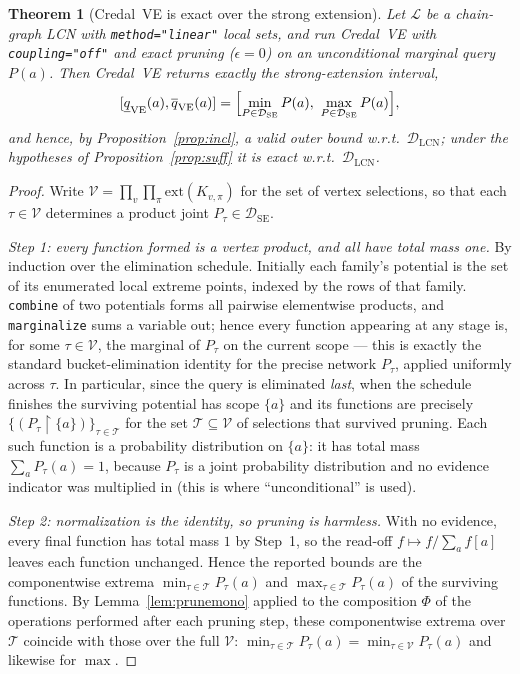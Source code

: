 \documentclass[11pt]{article}
\newtheorem{theorem}{Theorem}
\theoremstyle{definition}
\newcommand{\lo}{\underline}
\newcommand{\hi}{\overline}
\newcommand{\DSE}{\mathcal{D}_{\mathrm{SE}}}
\newcommand{\DLCN}{\mathcal{D}_{\mathrm{LCN}}}
\newcommand{\restr}{\!\restriction\!}
\newcommand{\ext}{\mathrm{ext}}
\begin{document}
\begin{theorem}[Credal~VE is exact over the strong extension]\label{thm:cve}
Let $\mathcal L$ be a chain-graph LCN with \texttt{method="linear"} local sets, and run Credal~VE
with \texttt{coupling="off"} and exact pruning ($\epsilon{=}0$) on an \emph{unconditional} marginal
query $P(a)$. Then Credal~VE returns exactly the strong-extension interval,
\[
  [\lo q_{\mathrm{VE}}(a),\hi q_{\mathrm{VE}}(a)]
  =\Bigl[\min_{P\in\DSE}P(a),\ \max_{P\in\DSE}P(a)\Bigr],
\]
and hence, by Proposition~\ref{prop:incl}, a valid outer bound w.r.t.\ $\DLCN$; under the hypotheses
of Proposition~\ref{prop:suff} it is exact w.r.t.\ $\DLCN$.
\end{theorem}

\begin{proof}
Write $\mathcal V=\prod_v\prod_\pi\ext(K_{v,\pi})$ for the set of vertex selections, so that each
$\tau\in\mathcal V$ determines a product joint $P_\tau\in\DSE$.

\emph{Step 1: every function formed is a vertex product, and all have total mass one.} By induction
over the elimination schedule. Initially each family's potential is the set of its enumerated local
extreme points, indexed by the rows of that family. \texttt{combine} of two potentials forms all
pairwise elementwise products, and \texttt{marginalize} sums a variable out; hence every function
appearing at any stage is, for some $\tau\in\mathcal V$, the marginal of $P_\tau$ on the current
scope --- this is exactly the standard bucket-elimination identity for the precise network $P_\tau$,
applied uniformly across $\tau$. In particular, since the query is eliminated \emph{last}, when the
schedule finishes the surviving potential has scope $\{a\}$ and its functions are precisely
$\{(P_\tau\restr\{a\})\}_{\tau\in\mathcal T}$ for the set $\mathcal T\subseteq\mathcal V$ of
selections that survived pruning. Each such function is a probability distribution on $\{a\}$: it has
total mass $\sum_a P_\tau(a)=1$, because $P_\tau$ is a joint probability distribution and no evidence
indicator was multiplied in (this is where ``unconditional'' is used).

\emph{Step 2: normalization is the identity, so pruning is harmless.} With no evidence, every final
function has total mass $1$ by Step~1, so the read-off $f\mapsto f/\sum_a f[a]$ leaves each function
unchanged. Hence the reported bounds are the componentwise extrema
$\min_{\tau\in\mathcal T}P_\tau(a)$ and $\max_{\tau\in\mathcal T}P_\tau(a)$ of the surviving
functions. By Lemma~\ref{lem:prunemono} applied to the composition $\Phi$ of the operations performed
after each pruning step, these componentwise extrema over $\mathcal T$ coincide with those over the
full $\mathcal V$:
$\min_{\tau\in\mathcal T}P_\tau(a)=\min_{\tau\in\mathcal V}P_\tau(a)$ and likewise for $\max$.


\end{proof}
\end{document}
